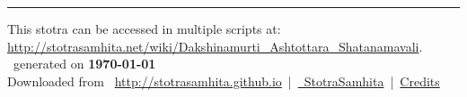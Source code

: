 \documentclass[a5paper,twoside,12pt]{book}
\begin{document}
\setmainfont[Script=Devanagari,Mapping=tex-text]{Sanskrit 2003}
\fontsize {16}{19.25}\selectfont
\let\head\chapt
\begin{center}

\end{center}
\vfill
\centering
\rule{0.8\textwidth}{0.6pt}

\footnotesize
{}\sffamily
This stotra can be accessed in multiple scripts at:\\
\url{http://stotrasamhita.net/wiki/Dakshinamurti_Ashtottara_Shatanamavali}.\\[1ex]
\faFilePdfO~generated on \textbf{\today}\\[1ex]
Downloaded from \faGlobe{}~\url{http://stotrasamhita.github.io}~|~\href{https://github.com/StotraSamhita}{\faGithubSquare{}~StotraSamhita}~|~\href{https://stotrasamhita.github.io/about/}{Credits}
\end{document}
